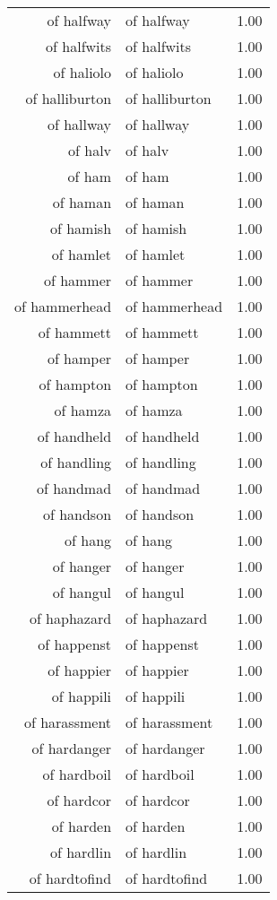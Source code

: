 \begin{table}[ht]
\begin{tabular}{rlr}
  of halfway & of halfway & 1.00 \\ 
  of halfwits & of halfwits & 1.00 \\ 
  of haliolo & of haliolo & 1.00 \\ 
  of halliburton & of halliburton & 1.00 \\ 
  of hallway & of hallway & 1.00 \\ 
  of halv & of halv & 1.00 \\ 
  of ham & of ham & 1.00 \\ 
  of haman & of haman & 1.00 \\ 
  of hamish & of hamish & 1.00 \\ 
  of hamlet & of hamlet & 1.00 \\ 
  of hammer & of hammer & 1.00 \\ 
  of hammerhead & of hammerhead & 1.00 \\ 
  of hammett & of hammett & 1.00 \\ 
  of hamper & of hamper & 1.00 \\ 
  of hampton & of hampton & 1.00 \\ 
  of hamza & of hamza & 1.00 \\ 
  of handheld & of handheld & 1.00 \\ 
  of handling & of handling & 1.00 \\ 
  of handmad & of handmad & 1.00 \\ 
  of handson & of handson & 1.00 \\ 
  of hang & of hang & 1.00 \\ 
  of hanger & of hanger & 1.00 \\ 
  of hangul & of hangul & 1.00 \\ 
  of haphazard & of haphazard & 1.00 \\ 
  of happenst & of happenst & 1.00 \\ 
  of happier & of happier & 1.00 \\ 
  of happili & of happili & 1.00 \\ 
  of harassment & of harassment & 1.00 \\ 
  of hardanger & of hardanger & 1.00 \\ 
  of hardboil & of hardboil & 1.00 \\ 
  of hardcor & of hardcor & 1.00 \\ 
  of harden & of harden & 1.00 \\ 
  of hardlin & of hardlin & 1.00 \\ 
  of hardtofind & of hardtofind & 1.00 \\ 

\end{tabular}
\end{table}
